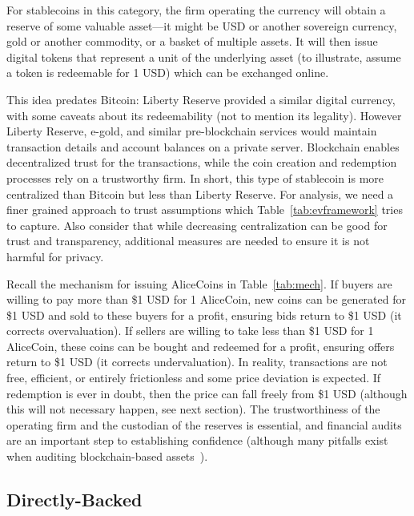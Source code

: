 For stablecoins in this category, the firm operating the currency will obtain a reserve of some valuable asset---it might be USD or another sovereign currency, gold or another commodity, or a basket of multiple assets.  It will then issue digital tokens that represent a unit of the underlying asset (to illustrate, assume a token is redeemable for 1 USD) which can be exchanged online.

This idea predates Bitcoin: Liberty Reserve provided a similar digital currency, with some caveats about its redeemability (not to mention its legality). However Liberty Reserve, e-gold, and similar pre-blockchain services would maintain transaction details and account balances on a private server. Blockchain enables decentralized trust for the transactions, while the coin creation and redemption processes rely on a trustworthy firm. In short, this type of stablecoin is more centralized than Bitcoin but less than Liberty Reserve. For analysis, we need a finer grained approach to trust assumptions which Table~\ref{tab:evframework} tries to capture. Also consider that while decreasing centralization can be good for trust and transparency, additional measures are needed to ensure it is not harmful for privacy.

Recall the mechanism for issuing AliceCoins in Table~\ref{tab:mech}. If buyers are willing to pay more than \$1 USD for 1 AliceCoin, new coins can be generated for \$1 USD and sold to these buyers for a profit, ensuring bids return to \$1 USD (it corrects overvaluation). If sellers are willing to take less than \$1 USD for 1 AliceCoin, these coins can be bought and redeemed for a profit, ensuring offers return to \$1 USD (it corrects undervaluation). In reality, transactions are not free, efficient, or entirely frictionless and some price deviation is expected. If redemption is ever in doubt, then the price can fall freely from \$1 USD (although this will not necessary happen, see next section). The trustworthiness of the operating firm and the custodian of the reserves is essential, and financial audits are an important step to establishing confidence (although many pitfalls exist when auditing blockchain-based assets~\cite{PBEC19}). 


\subsection{Directly-Backed}
\label{sec:tether}


